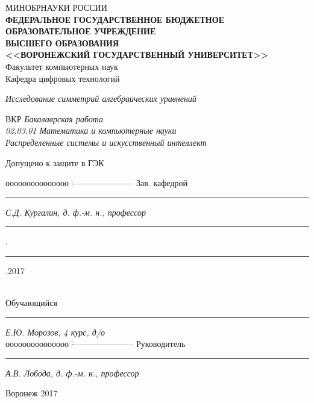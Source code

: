 \documentclass[../main.tex]{subfiles}
\begin{document}
\begin{spacing}{1.2}
{\sffamily \begin{small}
\thispagestyle{empty}
\center 
{МИНОБРНАУКИ РОССИИ}\\ \!
{\footnotesize\textbf{ФЕДЕРАЛЬНОЕ ГОСУДАРСТВЕННОЕ БЮДЖЕТНОЕ ОБРАЗОВАТЕЛЬНОЕ УЧРЕЖДЕНИЕ}\\ \!\!\textbf{ВЫСШЕГО ОБРАЗОВАНИЯ}}\\ 
\textbf{<<ВОРОНЕЖСКИЙ ГОСУДАРСТВЕННЫЙ УНИВЕРСИТЕТ>>}\\
{Факультет компьютерных наук}\\
{Кафедра цифровых технологий}\\

\vspace{1cm}

\textit{Исследование симметрий алгебраических уравнений}\\

\vspace{1cm}

{ВКР} \textit{Бакалаврская работа}\\
\textit{02.03.01 Математика и компьютерные науки}\\
\textit{Распределенные системы и искусственный интеллект}\\

\vspace{4.5cm}
\begin{flushleft}
{Допущено к защите в ГЭК}
\end{flushleft}
\begin{tabbing}
ооооооооооооооо	\=	----------------------	\kill
Зав. кафедрой\> 	\rule[0mm]{3cm}{0,3mm}	\textit{С.Д. Кургалин, д. ф.-м. н., профессор}{ \rule[0mm]{5mm}{0,3mm}.\rule[0mm]{5mm}{0,3mm}.2017}  \\
Обучающийся \> 	\rule[0mm]{3cm}{0,3mm}	\textit{Е.Ю. Морозов, 4 курс, д/о} \\ 
ооооооооооооооо	\=	----------------------	\kill
Руководитель\> 	\rule[0mm]{3cm}{0,3mm}  \textit{А.В. Лобода, д. ф.-м. н., профессор}
\end{tabbing}

\vspace{2cm}

\centerline{Воронеж 2017}
\end{small}}
\end{spacing}
\clearpage
\end{document}
